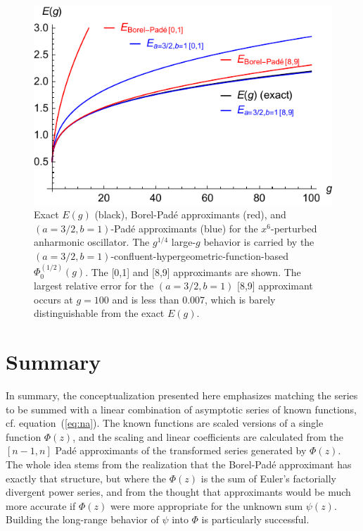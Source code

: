 \documentclass[12pt]{iopart}
\begin{document}
%
\begin{figure}
	\begin{center}
		\includegraphics[scale=.95]{figure2}
	\end{center}
	\caption{
		Exact $E(g)$ (black),  Borel-Pad\'e approximants (red), and $(a=3/2,b=1)$-Pad\'e approximants (blue) for the $x^6$-perturbed
		anharmonic oscillator. 
		The $g^{1/4}$ large-$g$ behavior is carried by the  $(a=3/2,b=1)$-confluent-hypergeometric-function-based $\Phi_0^{(1/2)}(g)$.
		The [0,1] and [8,9] approximants are shown. The largest relative error for the $(a=3/2,b=1)$ [8,9] approximant occurs at $g=100$ and is less than 0.007,
		which is barely distinguishable from the exact $E(g)$.}
	\label{fig:2}
\end{figure}
\section{Summary}
In summary, the conceptualization presented here emphasizes matching the series to be summed
with a linear combination of asymptotic series of known functions, cf. equation~(\ref{eq:na}).
The known functions are scaled versions of a single function $\Phi(z)$, and the scaling 
and  linear coefficients are calculated from the $[n-1,n]$ Pad\'e approximants of the transformed
series generated by $\Phi(z)$. The whole idea stems from the realization that the Borel-Pad\'e approximant has
exactly that structure, but where the $\Phi(z)$ is the sum of Euler's factorially divergent power series,
and from the thought that approximants would be much more accurate if $\Phi(z)$ were more appropriate
for the unknown sum $\psi(z)$. Building the long-range behavior of $\psi$ into $\Phi$ is particularly successful.
\end{document}
